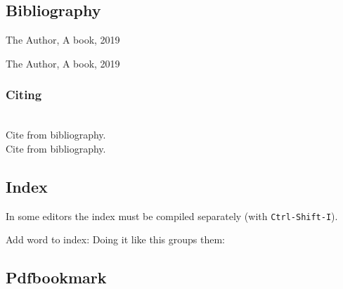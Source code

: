 \subsection{Bibliography}
\begin{minipage}{0.6\textwidth}
\begin{latex}
\begin{thebibliography}{99}
   The Author, A book, 2019
\end{thebibliography}
\end{latex}
\end{minipage}
\begin{minipage}{0.4\textwidth}
\vspace*{-2.5cm}
\begin{thebibliography}{99}
   The Author, A book, 2019
\end{thebibliography}
\end{minipage}

\subsubsection{Citing}
\begin{latex}
\hrulefill\\
  Cite from bibliography\cite{author/19}.\\
  Cite from bibliography\cite[Chapter VI, VII]{author/19}.
\end{latex}

\subsection{Index}
In some editors the index must be compiled separately (with \texttt{Ctrl-Shift-I}).\\
\begin{latex}
\usepackage{makeidx}
\makeindex

\printindex

Add word to index: 
Doing it like this groups them:  
\end{latex}

\subsection{Pdfbookmark}
\begin{latex}
\end{latex}
